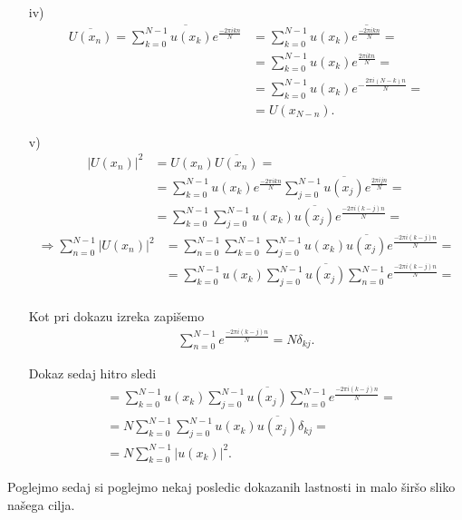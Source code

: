 \documentclass[mat2, tisk]{fmfdelo}
\begin{document}
\begin{dokaz}
\begin{enumerate}
\item[iv)]
\begin{align*}
  \overline{U(x_n)} = \overline{\sum_{k=0}^{N-1} u(x_k) e^{\frac{-2\pi i k n}{N}}} &= 
  \sum_{k=0}^{N-1} u(x_k) \overline{e^{\frac{-2\pi i k n}{N}}}=\\
  &= \sum_{k=0}^{N-1} u(x_k) e^{\frac{2\pi i k n}{N}}=  \\
  &= \sum_{k=0}^{N-1} u(x_k) e^{-\frac{2\pi i (N-k) n}{N}}= \\
  &= U(x_{N-n}).
\end{align*}
\item[v)] 
\begin{align*}
|U(x_n)|^2 &= U(x_n) \overline{U(x_n)} = \\
&= \sum_{k=0}^{N-1} u(x_k) e^{\frac{-2\pi i k n}{N}} \sum_{j=0}^{N-1} \overline{u(x_j)} e^{\frac{2\pi i j n}{N}} = \\
&= \sum_{k=0}^{N-1} \sum_{j=0}^{N-1} u(x_k) \overline{u(x_j)} e^{\frac{-2\pi i (k-j) n}{N}} = 
\end{align*}
\begin{align*}
\Longrightarrow \sum_{n=0}^{N-1} |U(x_n)|^2 &= \sum_{n=0}^{N-1} \sum_{k=0}^{N-1} \sum_{j=0}^{N-1} u(x_k) \overline{u(x_j)} e^{\frac{-2\pi i (k-j) n}{N}} = \\
&= \sum_{k=0}^{N-1}u(x_k) \sum_{j=0}^{N-1} \overline{u(x_j)} \sum_{n=0}^{N-1} e^{\frac{-2\pi i (k-j) n}{N}} = \\
\end{align*}

Kot pri dokazu izreka  zapišemo 
\begin{align*}
\sum_{n=0}^{N-1} e^{\frac{-2\pi i (k-j) n}{N}} = N \delta_{kj}.
\end{align*}

Dokaz sedaj hitro sledi 
\begin{align*}
&= \sum_{k=0}^{N-1}u(x_k) \sum_{j=0}^{N-1} \overline{u(x_j)} \sum_{n=0}^{N-1} e^{\frac{-2\pi i (k-j) n}{N}} = \\
&= N\sum_{k=0}^{N-1} \sum_{j=0}^{N-1} u(x_k)\overline{u(x_j)} \delta_{kj} = \\
&= N\sum_{k=0}^{N-1} |u(x_k)|^2.
\end{align*}
\end{enumerate}
\end{dokaz}

Poglejmo sedaj si poglejmo nekaj posledic dokazanih lastnosti in malo 
širšo sliko našega cilja. \\
\end{document}
